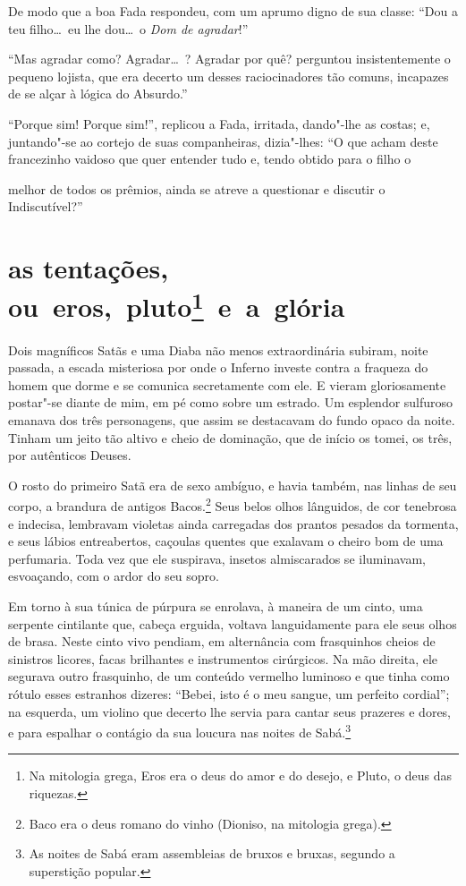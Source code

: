 De modo que a boa Fada respondeu, com um aprumo digno de sua classe:
``Dou a teu filho\ldots\  eu lhe dou\ldots\  o \textit{Dom de
agradar}!''

``Mas agradar como? Agradar\ldots\ ? Agradar por quê? perguntou insistentemente 
o pequeno lojista, que era decerto um desses
raciocinadores tão comuns, incapazes de se alçar à lógica do
Absurdo.''

``Porque sim! Porque sim!'', replicou a Fada,
irritada, dando"-lhe as costas; e, juntando"-se ao cortejo de suas
companheiras, dizia"-lhes: ``O que acham deste
francezinho vaidoso que quer entender tudo e, tendo obtido para o filho o 

\quebra

\noindent{}melhor de todos os prêmios, ainda se atreve a questionar e discutir o
Indiscutível?''

\quebra\section[As tentações, ou eros, pluto e a grória]{as tentações, ou~eros,~pluto\protect\footnote{ Na mitologia 
grega, Eros era o deus do amor e do desejo, e Pluto, o deus das riquezas.}~e~a~glória}

Dois magníficos Satãs e uma Diaba não menos extraordinária subiram,
noite passada, a escada misteriosa por onde o Inferno investe contra a
fraqueza do homem que dorme e se comunica secretamente com ele. E 
vieram gloriosamente postar"-se diante de mim, em pé como sobre um
estrado. Um esplendor sulfuroso emanava dos três personagens, que
assim se destacavam do fundo opaco da noite. Tinham um jeito tão altivo
e cheio de dominação, que de início os tomei, os três, por autênticos Deuses.

O rosto do primeiro Satã era de sexo ambíguo, e havia também, nas linhas
de seu corpo, a brandura de antigos Bacos.\protect\footnote{ Baco era o deus 
romano do vinho (Dioniso, na mitologia grega).}
Seus belos olhos lânguidos, de cor tenebrosa e indecisa, lembravam
violetas ainda carregadas dos prantos pesados da tormenta, e seus
lábios entreabertos, caçoulas quentes que exalavam o cheiro
bom de uma perfumaria. Toda vez que ele suspirava, insetos
almiscarados se iluminavam, esvoaçando, com o ardor do seu sopro.

Em torno à sua túnica de púrpura se enrolava, à maneira de um cinto,
uma serpente cintilante que, cabeça erguida, voltava
languidamente para ele seus olhos de brasa. Neste cinto vivo pendiam, em alternância com frasquinhos cheios de sinistros licores,
facas brilhantes e instrumentos cirúrgicos. Na mão direita, ele segurava
outro frasquinho, de um conteúdo vermelho luminoso e que
tinha como rótulo esses estranhos dizeres: ``Bebei,
isto é o meu sangue, um perfeito cordial''; na esquerda,
um violino que decerto lhe servia para cantar seus prazeres e
dores, e para espalhar o contágio da sua loucura nas noites de
Sabá.\protect\footnote{ As noites de Sabá eram assembleias de bruxos e bruxas, segundo a
superstição popular.}

